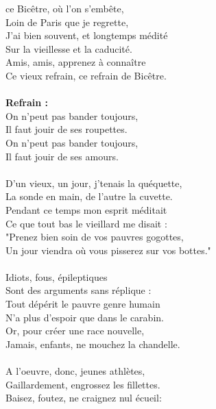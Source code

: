 
 ce Bicêtre, où l'on s'embête,
\\Loin de Paris que je regrette,
\\J'ai bien souvent, et longtemps médité
\\Sur la vieillesse et la caducité.
\\Amis, amis, apprenez à connaître
\\Ce vieux refrain, ce refrain de Bicêtre.
\\\\\textbf{Refrain :}
\\On n'peut pas bander toujours,
\\Il faut jouir de ses roupettes.
\\On n'peut pas bander toujours,
\\Il faut jouir de ses amours.
\\\\D'un vieux, un jour, j'tenais la quéquette,
\\La sonde en main, de l'autre la cuvette.
\\Pendant ce temps mon esprit méditait
\\Ce que tout bas le vieillard me disait :
\\"Prenez bien soin de vos pauvres gogottes,
\\Un jour viendra où vous pisserez sur vos bottes."
\\\\Idiots, fous, épileptiques
\\Sont des arguments sans réplique :
\\Tout dépérit le pauvre genre humain
\\N'a plus d'espoir que dans le carabin.
\\Or, pour créer une race nouvelle,
\\Jamais, enfants, ne mouchez la chandelle.
\\\\A l'oeuvre, donc, jeunes athlètes,
\\Gaillardement, engrossez les fillettes.
\\Baisez, foutez, ne craignez nul écueil:

